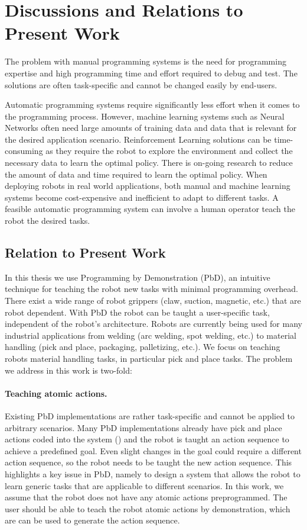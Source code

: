 \section{Discussions and Relations to Present Work}
The problem with manual programming systems is the need for programming expertise and high programming time and effort required to debug and test.
The solutions are often task-specific and cannot be changed easily by end-users.

Automatic programming systems require significantly less effort when it comes to the programming process. 
However, machine learning systems such as Neural Networks often need large amounts of training data and data that is relevant for the desired application scenario.
Reinforcement Learning solutions can be time-consuming as they require the robot to explore the environment and collect the necessary data to learn the optimal policy.
There is on-going research to reduce the amount of data and time required to learn the optimal policy.
When deploying robots in real world applications, both manual and machine learning systems become cost-expensive and inefficient to adapt to different tasks.
A feasible automatic programming system can involve a human operator teach the robot the desired tasks.


\subsection{Relation to Present Work}
In this thesis we use Programming by Demonstration (PbD), an intuitive technique for teaching the robot new tasks with minimal programming overhead.
There exist a wide range of robot grippers (claw, suction, magnetic, etc.) that are robot dependent.
With PbD the robot can be taught a user-specific task, independent of the robot's architecture.
Robots are currently being used for many industrial applications from welding (arc welding, spot welding, etc.) to material handling (pick and place, packaging, palletizing, etc.).
We focus on teaching robots material handling tasks, in particular pick and place tasks.
The problem we address in this work is two-fold:
\paragraph{Teaching atomic actions.}
Existing PbD implementations are rather task-specific and cannot be applied to arbitrary scenarios.
Many PbD implementations already have pick and place actions coded into the system (\cite{veeraraghavan2008teaching}) and the robot is taught an action sequence to achieve a predefined goal.
Even slight changes in the goal could require a different action sequence, so the robot needs to be taught the new action sequence.
This highlights a key issue in PbD, namely to design a system that allows the robot to learn  generic tasks that are applicable to different scenarios.
In this work, we assume that the robot does not have any atomic actions preprogrammed.
The user should be able to teach the robot atomic actions by demonstration, which are can be used to generate the action sequence.

